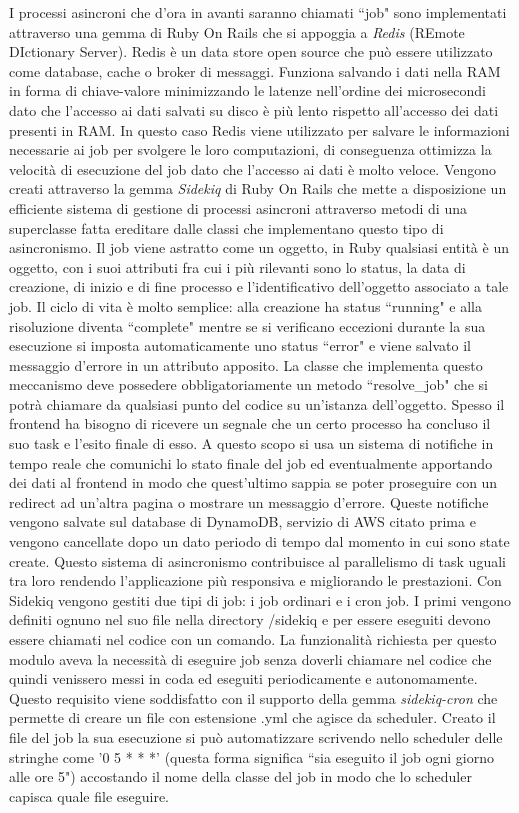 \documentclass[target=bach,aauheader=,style=]{thud}
\begin{document}
I processi asincroni che d'ora in avanti saranno chiamati ``job" sono implementati attraverso una gemma di Ruby On Rails che si appoggia a \textit{Redis} \cite{redis_home} (REmote DIctionary Server).
Redis è un data store open source che può essere utilizzato come database, cache o broker di messaggi. Funziona salvando i dati nella RAM in forma di chiave-valore minimizzando le latenze nell'ordine dei
microsecondi dato che l'accesso ai dati salvati su disco è più lento rispetto all'accesso dei dati presenti in RAM. In questo caso Redis viene utilizzato per salvare le informazioni necessarie ai
job per svolgere le loro computazioni, di conseguenza ottimizza la velocità di esecuzione del job dato che l'accesso ai dati è molto veloce.
Vengono creati attraverso la gemma \textit{Sidekiq} \cite{sidekiq} di Ruby On Rails che mette a disposizione un efficiente sistema di gestione di processi asincroni attraverso
metodi di una superclasse fatta ereditare dalle classi che implementano questo tipo di asincronismo. Il job viene astratto come un oggetto, in
Ruby qualsiasi entità è un oggetto, con i suoi attributi fra cui i più rilevanti sono lo status, la data di creazione, di inizio e di fine processo e l'identificativo dell'oggetto associato a tale job.
Il ciclo di vita è molto semplice: alla creazione ha status ``running" e alla risoluzione diventa ``complete" mentre se si verificano eccezioni durante la sua esecuzione
si imposta automaticamente uno status ``error" e viene salvato il messaggio d'errore in un attributo apposito. La classe che implementa questo meccanismo deve possedere obbligatoriamente un metodo
``resolve\_job" che si potrà chiamare da qualsiasi punto del codice su un'istanza dell'oggetto. Spesso il frontend ha bisogno di ricevere un segnale che un certo processo ha concluso il suo task e
l'esito finale di esso. A questo scopo si usa un sistema di notifiche in tempo reale che comunichi lo stato finale del job ed eventualmente apportando dei dati al frontend in modo che quest'ultimo
sappia se poter proseguire con un redirect ad un'altra pagina o mostrare un messaggio d'errore. Queste notifiche vengono salvate sul database di DynamoDB, servizio di AWS citato
prima e vengono cancellate dopo un dato periodo di tempo dal momento in cui sono state create. Questo sistema di asincronismo contribuisce al parallelismo di task uguali tra loro rendendo
l'applicazione più responsiva e migliorando le prestazioni. Con Sidekiq vengono gestiti due tipi di job: i job ordinari e i cron job. I primi vengono definiti ognuno nel suo file nella directory
/sidekiq e per essere eseguiti devono essere chiamati nel codice con un comando. La funzionalità richiesta per questo modulo aveva la necessità di eseguire job senza doverli chiamare nel
codice che quindi venissero messi in coda ed eseguiti periodicamente e autonomamente. Questo requisito viene soddisfatto con il supporto della gemma \textit{sidekiq-cron} \cite{sidekiq_cron_gem} che
permette di creare un file con estensione .yml che agisce da scheduler. Creato il file del job la sua esecuzione si può automatizzare scrivendo nello scheduler delle stringhe come '0 5 * * *'
(questa forma significa ``sia eseguito il job ogni giorno alle ore 5") accostando il nome della classe del job in modo che lo scheduler capisca quale file eseguire.
\end{document}
